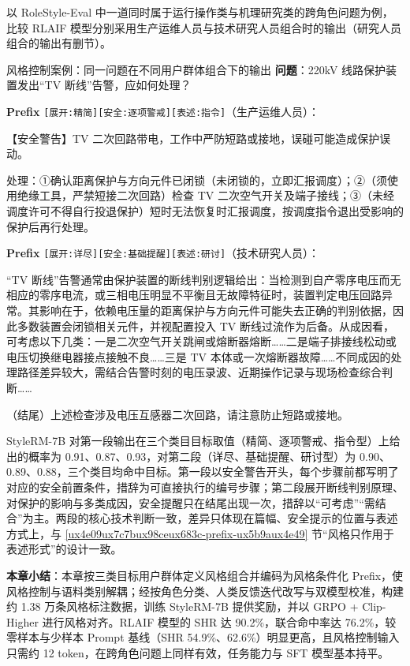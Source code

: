 \documentclass[fontset=fandol,type=master,campus=shenzhen,etitleauto=true]{hithesisbook}
\begin{document}
以 RoleStyle-Eval 中一道同时属于运行操作类与机理研究类的跨角色问题为例，比较 RLAIF 模型分别采用生产运维人员与技术研究人员组合时的输出（研究人员组合的输出有删节）。

\begin{promptbox}{风格控制案例：同一问题在不同用户群体组合下的输出}
\textbf{问题}：220kV 线路保护装置发出“TV 断线”告警，应如何处理？\par\smallskip
\textbf{Prefix} \texttt{[展开:精简][安全:逐项警戒][表述:指令]}（生产运维人员）：\par
【安全警告】TV 二次回路带电，工作中严防短路或接地，误碰可能造成保护误动。\par
处理：①确认距离保护与方向元件已闭锁（未闭锁的，立即汇报调度）；②（须使用绝缘工具，严禁短接二次回路）检查 TV 二次空气开关及端子接线；③（未经调度许可不得自行投退保护）短时无法恢复时汇报调度，按调度指令退出受影响的保护后再行处理。\par\smallskip
\textbf{Prefix} \texttt{[展开:详尽][安全:基础提醒][表述:研讨]}（技术研究人员）：\par
“TV 断线”告警通常由保护装置的断线判别逻辑给出：当检测到自产零序电压而无相应的零序电流，或三相电压明显不平衡且无故障特征时，装置判定电压回路异常。其影响在于，依赖电压量的距离保护与方向元件可能失去正确的判别依据，因此多数装置会闭锁相关元件，并视配置投入 TV 断线过流作为后备。从成因看，可考虑以下几类：一是二次空气开关跳闸或熔断器熔断……二是端子排接线松动或电压切换继电器接点接触不良……三是 TV 本体或一次熔断器故障……不同成因的处理路径差异较大，需结合告警时刻的电压录波、近期操作记录与现场检查综合判断……\par
（结尾）上述检查涉及电压互感器二次回路，请注意防止短路或接地。
\end{promptbox}

StyleRM-7B 对第一段输出在三个类目目标取值（精简、逐项警戒、指令型）上给出的概率为 0.91、0.87、0.93，对第二段（详尽、基础提醒、研讨型）为 0.90、0.89、0.88，三个类目均命中目标。第一段以安全警告开头，每个步骤前都写明了对应的安全前置条件，措辞为可直接执行的编号步骤；第二段展开断线判别原理、对保护的影响与多类成因，安全提醒只在结尾出现一次，措辞以“可考虑”“需结合”为主。两段的核心技术判断一致，差异只体现在篇幅、安全提示的位置与表述方式上，与 \ref{ux4e09ux7c7bux98ceux683c-prefix-ux5b9aux4e49} 节“风格只作用于表述形式”的设计一致。

\vspace{0.5cm}
\noindent \textbf{本章小结}：本章按三类目标用户群体定义风格组合并编码为风格条件化 Prefix，使风格控制与语料类别解耦；经按角色分类、人类反馈迭代改写与双模型校准，构建约 1.38 万条风格标注数据，训练 StyleRM-7B 提供奖励，并以 GRPO + Clip-Higher 进行风格对齐。RLAIF 模型的 SHR 达 90.2\%，联合命中率达 76.2\%，较零样本与少样本 Prompt 基线（SHR 54.9\%、62.6\%）明显更高，且风格控制输入只需约 12 token，在跨角色问题上同样有效，任务能力与 SFT 模型基本持平。
\end{document}
